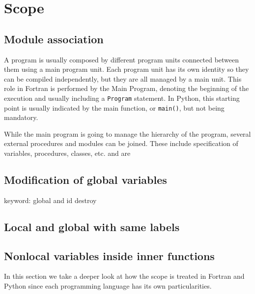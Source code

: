 \chapter{Scope} 



    \section{Module association}

A program is usually composed by different program units connected between them using a main program unit. 
Each program unit has its own identity so they can be compiled independently, but they are all managed by a main unit.
This role in Fortran is performed by the Main Program, denoting the beginning of the execution and usually including a \texttt{Program} statement. 
In Python, this starting point is usually indicated by the main function, or \texttt{main()}, but not being mandatory.

While the main program is going to manage the hierarchy of the program, several external procedures and modules can be joined. 
These include specification of variables, procedures, classes, etc. and are 







\section{Modification of global variables}
keyword: global and id destroy 

\section{Local and global with same labels}

\section{Nonlocal variables inside inner functions} 



In this section we take a deeper look at how the scope is treated in Fortran and Python since each programming language has its own particularities. 


